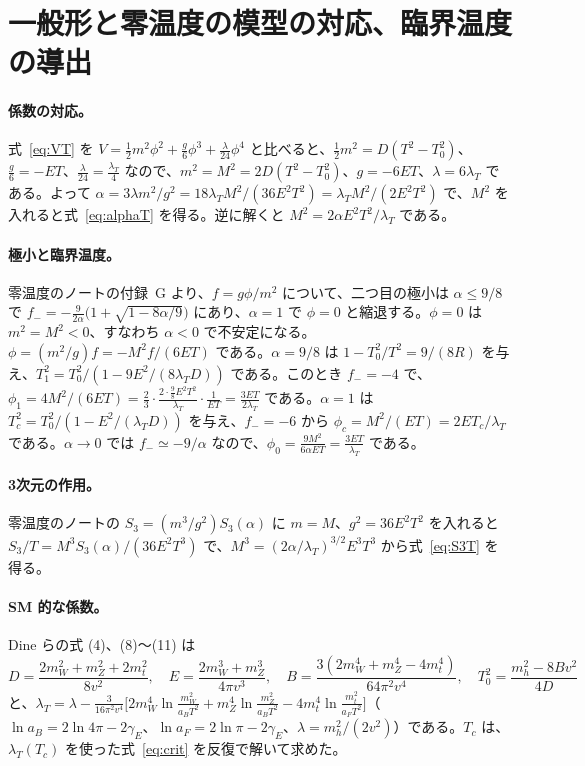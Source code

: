 \documentclass[a4paper,10pt]{ltjsarticle}
\begin{document}
\appendix

\section{一般形と零温度の模型の対応、臨界温度の導出}\label{app:map}

\paragraph{係数の対応。}式~\eqref{eq:VT} を $V=\frac12m^2\phi^2+\frac g6\phi^3+\frac\lambda{24}\phi^4$ と比べると、$\frac12m^2=D(T^2-T_0^2)$、$\frac g6=-ET$、$\frac\lambda{24}=\frac{\lambda_T}4$ なので、$m^2=M^2=2D(T^2-T_0^2)$、$g=-6ET$、$\lambda=6\lambda_T$ である。よって $\alpha=3\lambda m^2/g^2=18\lambda_TM^2/(36E^2T^2)=\lambda_TM^2/(2E^2T^2)$ で、$M^2$ を入れると式~\eqref{eq:alphaT} を得る。逆に解くと $M^2=2\alpha E^2T^2/\lambda_T$ である。

\paragraph{極小と臨界温度。}零温度のノートの付録~G より、$f=g\phi/m^2$ について、二つ目の極小は $\alpha\le9/8$ で $f_-=-\frac{9}{2\alpha}\bigl(1+\sqrt{1-8\alpha/9}\bigr)$ にあり、$\alpha=1$ で $\phi=0$ と縮退する。$\phi=0$ は $m^2=M^2<0$、すなわち $\alpha<0$ で不安定になる。$\phi=(m^2/g)f=-M^2f/(6ET)$ である。$\alpha=9/8$ は $1-T_0^2/T^2=9/(8R)$ を与え、$T_1^2=T_0^2/(1-9E^2/(8\lambda_TD))$ である。このとき $f_-=-4$ で、$\phi_1=4M^2/(6ET)=\frac23\cdot\frac{2\cdot\frac98E^2T^2}{\lambda_T}\cdot\frac{1}{ET}=\frac{3ET}{2\lambda_T}$ である。$\alpha=1$ は $T_c^2=T_0^2/(1-E^2/(\lambda_TD))$ を与え、$f_-=-6$ から $\phi_c=M^2/(ET)=2ET_c/\lambda_T$ である。$\alpha\to0$ では $f_-\simeq-9/\alpha$ なので、$\phi_0=\frac{9M^2}{6\alpha ET}=\frac{3ET}{\lambda_T}$ である。

\paragraph{3次元の作用。}零温度のノートの $S_3=(m^3/g^2)S_3(\alpha)$ に $m=M$、$g^2=36E^2T^2$ を入れると $S_3/T=M^3S_3(\alpha)/(36E^2T^3)$ で、$M^3=(2\alpha/\lambda_T)^{3/2}E^3T^3$ から式~\eqref{eq:S3T} を得る。

\paragraph{SM 的な係数。}Dine らの式 (4)、(8)〜(11) は
\begin{equation*}
D=\frac{2m_W^2+m_Z^2+2m_t^2}{8v^2},\quad E=\frac{2m_W^3+m_Z^3}{4\pi v^3},\quad B=\frac{3(2m_W^4+m_Z^4-4m_t^4)}{64\pi^2v^4},\quad
T_0^2=\frac{m_h^2-8Bv^2}{4D}
\end{equation*}
と、$\lambda_T=\lambda-\frac{3}{16\pi^2v^4}\bigl[2m_W^4\ln\frac{m_W^2}{a_BT^2}+m_Z^4\ln\frac{m_Z^2}{a_BT^2}-4m_t^4\ln\frac{m_t^2}{a_FT^2}\bigr]$（$\ln a_B=2\ln4\pi-2\gamma_E$、$\ln a_F=2\ln\pi-2\gamma_E$、$\lambda=m_h^2/(2v^2)$）である。$T_c$ は、$\lambda_T(T_c)$ を使った式~\eqref{eq:crit} を反復で解いて求めた。
\end{document}
